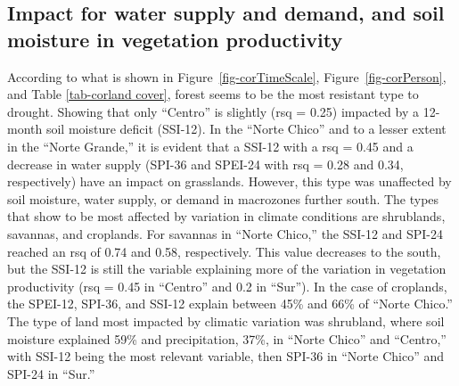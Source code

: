 \documentclass[
  number,
  preprint,
  3p,
  onecolumn]{elsarticle}
\begin{document}
\hypertarget{impact-for-water-supply-and-demand-and-soil-moisture-in-vegetation-productivity}{%
\subsection{Impact for water supply and demand, and soil moisture in
vegetation
productivity}\label{impact-for-water-supply-and-demand-and-soil-moisture-in-vegetation-productivity}}

According to what is shown in Figure~\ref{fig-corTimeScale},
Figure~\ref{fig-corPerson}, and Table \ref{tab-corland cover}, forest
seems to be the most resistant type to drought. Showing that only
``Centro'' is slightly (rsq = 0.25) impacted by a 12-month soil moisture
deficit (SSI-12). In the ``Norte Chico'' and to a lesser extent in the
``Norte Grande,'' it is evident that a SSI-12 with a rsq = 0.45 and a
decrease in water supply (SPI-36 and SPEI-24 with rsq = 0.28 and 0.34,
respectively) have an impact on grasslands. However, this type was
unaffected by soil moisture, water supply, or demand in macrozones
further south. The types that show to be most affected by variation in
climate conditions are shrublands, savannas, and croplands. For savannas
in ``Norte Chico,'' the SSI-12 and SPI-24 reached an rsq of 0.74 and
0.58, respectively. This value decreases to the south, but the SSI-12 is
still the variable explaining more of the variation in vegetation
productivity (rsq = 0.45 in ``Centro'' and 0.2 in ``Sur''). In the case
of croplands, the SPEI-12, SPI-36, and SSI-12 explain between 45\% and
66\% of ``Norte Chico.'' The type of land most impacted by climatic
variation was shrubland, where soil moisture explained 59\% and
precipitation, 37\%, in ``Norte Chico'' and ``Centro,'' with SSI-12
being the most relevant variable, then SPI-36 in ``Norte Chico'' and
SPI-24 in ``Sur.''

\newpage

\blandscape
\end{document}
